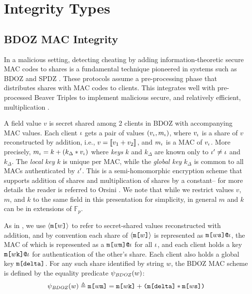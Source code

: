 \section{Integrity Types}
\label{section-ipj}

\subsection{BDOZ MAC Integrity}

In a malicious setting, detecting cheating by adding
information-theoretic secure MAC codes to shares is a fundamental
technique pioneered in systems such as BDOZ and SPDZ
\cite{SPDZ1,SPDZ2,BDOZ,10.1007/978-3-030-68869-1_3}.  These protocols
assume a pre-processing phase that distributes shares with MAC codes
to clients.  This integrates well with pre-processed Beaver Triples to
implement malicious secure, and relatively efficient, multiplication
\cite{evans2018pragmatic}.

A field value $v$ is secret shared among 2 clients in BDOZ with
accompanying MAC values.  Each client $\iota$ gets a pair of values
$(v_\iota,m_\iota)$, where $v_\iota$ is a share of $v$ reconstructed by
addition, i.e., $v = \llbracket v_1 + v_2 \rrbracket_{}$, and $m_\iota$ is a MAC of
$v_\iota$.  More precisely, $m_\iota = k + (k_\Delta * v_\iota)$ where
\emph{keys} $k$ and $k_\Delta$ are known only to $\iota' \ne \iota$ and
$k_\Delta$. The \emph{local key} $k$ is unique per MAC, while the
\emph{global key} $k_\Delta$ is common to all MACs authenticated by
$\iota'$. This is a semi-homomorphic encryption scheme that supports
addition of shares and multiplication of shares by a constant-- for
more details the reader is referred to Orsini
\cite{10.1007/978-3-030-68869-1_3}. We note that while we restrict
values $v$, $m$, and $k$ to the same field in this presentation for
simplicity, in general $m$ and $k$ can be in extensions of
$\mathbb{F}_p$.

As in \cite{skalka-near-ppdp24}, we use $\langle \texttt{m[}w\texttt{]} \rangle$ to refer to
secret-shared values reconstructed with addition, and by
convention each share of $\langle \texttt{m[}w\texttt{]} \rangle$ is represented as
$\texttt{m[}w\texttt{s}\texttt{]}\texttt{@}\iota$, the MAC of which is represented as a
$\texttt{m[}w\texttt{m}\texttt{]}\texttt{@}\iota$ for all $\iota$, and each client holds a
key $\texttt{m[}w\texttt{k}\texttt{]}\texttt{@}\iota$ for authentication of the other's
share. Each client also holds a global key $\texttt{m[}\texttt{delta}\texttt{]}$. For
any such share identified by string $w$, the BDOZ MAC scheme is defined 
by the equality predicate $\psi_{\mathit{BDOZ}}(w)$:
$$
\psi_{\mathit{BDOZ}}(w) \triangleq
\texttt{m[}w\texttt{m}\texttt{]} = \texttt{m[}w\texttt{k}\texttt{]} + \texttt{(}\texttt{m[}\texttt{delta}\texttt{]} *
\texttt{m[}w\texttt{s}\texttt{]}\texttt{)}
$$


